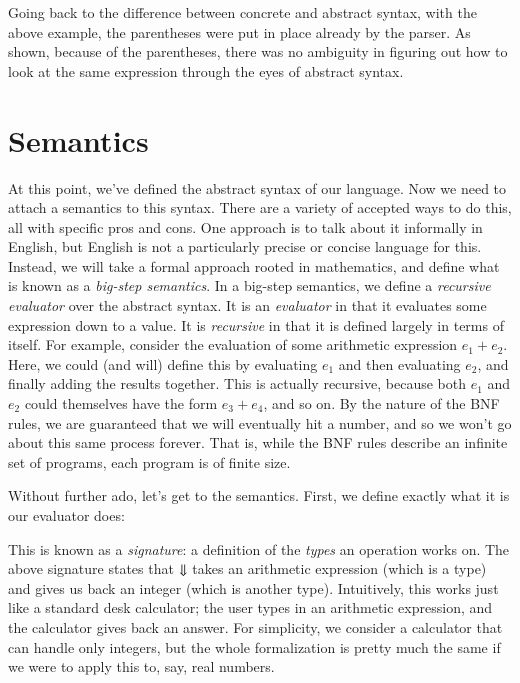 \documentclass[nocopyrightspace]{sigplanconf}
\begin{document}
Going back to the difference between concrete and abstract syntax, with the above example, the parentheses were put in place already by the parser.
As shown, because of the parentheses, there was no ambiguity in figuring out how to look at the same expression through the eyes of abstract syntax.

\section{Semantics}
At this point, we've defined the abstract syntax of our language.
Now we need to attach a semantics to this syntax.
There are a variety of accepted ways to do this, all with specific pros and cons.
One approach is to talk about it informally in English, but English is not a particularly precise or concise language for this.
Instead, we will take a formal approach rooted in mathematics, and define what is known as a \emph{big-step semantics}.
In a big-step semantics, we define a \emph{recursive evaluator} over the abstract syntax.
It is an \emph{evaluator} in that it evaluates some expression down to a value.
It is \emph{recursive} in that it is defined largely in terms of itself.
For example, consider the evaluation of some arithmetic expression $e_1 + e_2$.
Here, we could (and will) define this by evaluating $e_1$ and then evaluating $e_2$, and finally adding the results together.
This is actually recursive, because both $e_1$ and $e_2$ could themselves have the form $e_3 + e_4$, and so on.
By the nature of the BNF rules, we are guaranteed that we will eventually hit a number, and so we won't go about this same process forever.
That is, while the BNF rules describe an infinite set of programs, each program is of finite size.

Without further ado, let's get to the semantics.
First, we define exactly what it is our evaluator does:

\framed[]{
  \begin{gather*}
    \eval \;\in \Exp \to \Int
  \end{gather*}
}

This is known as a \emph{signature}: a definition of the \emph{types} an operation works on.
The above signature states that $\Downarrow$ takes an arithmetic expression (which is a type) and gives us back an integer (which is another type).
Intuitively, this works just like a standard desk calculator; the user types in an arithmetic expression, and the calculator gives back an answer.
For simplicity, we consider a calculator that can handle only integers, but the whole formalization is pretty much the same if we were to apply this to, say, real numbers.
\end{document}
